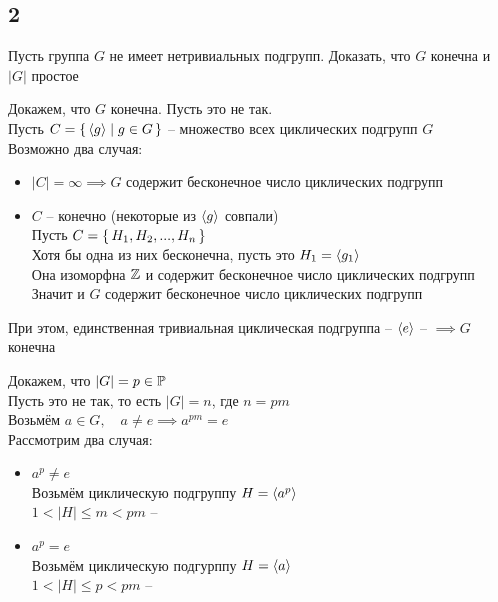 \subsection{2}

\begin{statement}
	Пусть группа $ G $ не имеет нетривиальных подгрупп. Доказать, что $ G $ конечна и $ |G| $ простое
\end{statement}

\begin{iproof}
    \item Докажем, что $ G $ конечна. Пусть это не так. \\
    Пусть $ C = \set{\braket{g} | g \in G} $ -- множество всех циклических подгрупп $ G $ \\
    Возможно два случая:
    \begin{itemize}
    	\item $ |C| = \infty \implies G $ содержит бесконечное число циклических подгрупп
        \item $ C $ -- конечно (некоторые из $ \braket{g} $ совпали) \\
        Пусть $ C = \set{H_1, H_2, ..., H_n} $ \\
        Хотя бы одна из них бесконечна, пусть это $ H_1 = \braket{g_1} $ \\
        Она изоморфна $ \mathbb{Z} $ и содержит бесконечное число циклических подгрупп \\
        Значит и $ G $ содержит бесконечное число циклических подгрупп
    \end{itemize}
    При этом, единственная тривиальная циклическая подгруппа -- $ \braket{e} $ -- \contra $ \implies G $ конечна
    \item Докажем, что $ |G| = p \in \mathbb{P} $ \\
    Пусть это не так, то есть $ |G| = n $, где $ n = pm $ \\
    Возьмём $ a \in G, \quad a \ne e \implies a^{pm} = e $ \\
    Рассмотрим два случая:
    \begin{itemize}
    	\item $ a^p \ne e $ \\
        Возьмём циклическую подгруппу $ H = \braket{a^p} $ \\
        $ 1 < |H| \le m < pm $ -- \contra
        \item $ a^p = e $ \\
        Возьмём циклическую подгурппу $ H = \braket{a} $ \\
        $ 1 < |H| \le p < pm $ -- \contra
    \end{itemize}
\end{iproof}

